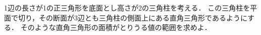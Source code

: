 \documentclass[../../main.tex]{subfiles}
\begin{document}
1辺の長さが1の正三角形を底面とし高さが2の三角柱を考える．
この三角柱を平面で切り，その断面が3辺とも三角柱の側面上にある直角三角形であるようにする．
そのような直角三角形の面積がとりうる値の範囲を求めよ．
\end{document}
